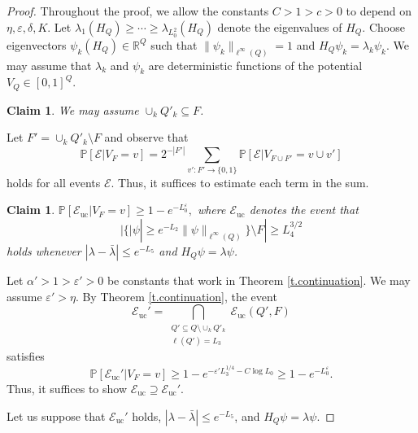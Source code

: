 \documentclass{amsart}
\newtheorem{claim}[equation]{Claim}
\newcommand{\tref}[1]{Theorem \ref{t.#1}}
\numberwithin{equation}{section}
\numberwithin{figure}{section}
\newcommand{\R}{\mathbb{R}}
\renewcommand{\P}{\mathbb{P}}
\newcommand{\ep}{\varepsilon}
\begin{document}
\begin{proof}
Throughout the proof, we allow the constants $C > 1 > c > 0$ to depend on $\eta, \ep, \delta, K$.  Let $\lambda_1(H_Q) \geq \cdots \geq \lambda_{L_0^2}(H_Q)$ denote the eigenvalues of $H_Q$.  Choose eigenvectors $\psi_k(H_Q) \in \R^Q$ such that $\| \psi_k \|_{\ell^\infty(Q)} = 1$ and $H_Q \psi_k = \lambda_k \psi_k$.  We may assume that $\lambda_k$ and $\psi_k$ are deterministic functions of the potential $V_Q \in [0,1]^Q$.

\begin{claim}
We may assume $\cup_k Q'_k \subseteq F$.
\end{claim}

Let $F' = \cup_k Q'_k \setminus F$ and observe that
\begin{equation*}
\P[\mathcal E | V_F = v] = 2^{-|F'|} \sum_{v' : F' \to \{ 0, 1 \}} \P[\mathcal E | V_{F \cup F'} = v \cup v']
\end{equation*}
holds for all events $\mathcal E$.  Thus, it suffices to estimate each term in the sum.

\begin{claim}
$\P[\mathcal E_{\mathrm{uc}}|V_F = v] \geq 1 - e^{-L_0^\ep},$ where $\mathcal E_{\mathrm{uc}}$ denotes the event that
\begin{equation*}
|\{ |\psi| \geq e^{-L_2} \| \psi \|_{\ell^\infty(Q)} \} \setminus F| \geq L_4^{3/2}
\end{equation*}
holds whenever $|\lambda - \bar \lambda| \leq e^{-L_5}$ and $H_Q \psi = \lambda \psi$.
\end{claim}

Let $\alpha' > 1 > \ep' > 0$ be constants that work in \tref{continuation}.  We may assume $\ep' > \eta$.  By \tref{continuation}, the event
\begin{equation*}
\mathcal E_{\mathrm{uc}}' = \bigcap_{\substack{Q' \subseteq Q \setminus \cup_k Q'_k \\ \ell(Q') = L_3}} \mathcal E_{\mathrm{uc}}(Q',F)
\end{equation*}
satisfies
\begin{equation*}
\P[\mathcal E_{\mathrm{uc}}' | V_F = v] \geq 1 - e^{-\ep' L_3^{1/4} - C \log L_0} \geq 1 - e^{-L_0^\ep}.
\end{equation*}
Thus, it suffices to show $\mathcal E_{\mathrm{uc}} \supseteq \mathcal E_{\mathrm{uc}}'$.

Let us suppose that $\mathcal E_{\mathrm{uc}}'$ holds, $|\lambda - \bar \lambda| \leq e^{-L_5}$, and $H_Q \psi = \lambda \psi$.


\end{proof}
\end{document}
